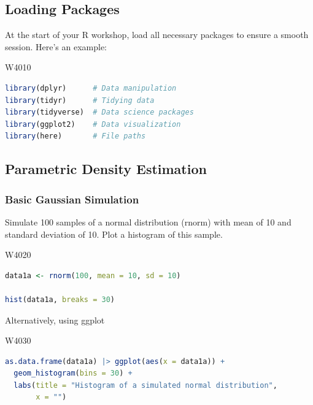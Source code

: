 \subsection{Loading Packages}

\indent

At the start of your R workshop, load all necessary packages to ensure a smooth session. Here’s an example:


\begin{ocg}{}{W401}{0}
\begin{lstlisting}[language = R]
library(dplyr)      # Data manipulation
library(tidyr)      # Tidying data
library(tidyverse)  # Data science packages
library(ggplot2)    # Data visualization
library(here)       # File paths
\end{lstlisting}
\end{ocg}

\subsection{Parametric Density Estimation}

\indent 

\subsubsection{Basic Gaussian Simulation}

\indent 

Simulate 100 samples of a normal distribution (rnorm) with mean of 10 and standard deviation of 10. Plot a histogram of this sample.


\begin{ocg}{}{W402}{0}
\begin{lstlisting}[language = R]
data1a <- rnorm(100, mean = 10, sd = 10)

hist(data1a, breaks = 30)
\end{lstlisting}
\end{ocg}

Alternatively, using ggplot


\begin{ocg}{}{W403}{0}
\begin{lstlisting}[language = R]
as.data.frame(data1a) |> ggplot(aes(x = data1a)) +
  geom_histogram(bins = 30) +
  labs(title = "Histogram of a simulated normal distribution", 
       x = "")
\end{lstlisting}
\end{ocg}

